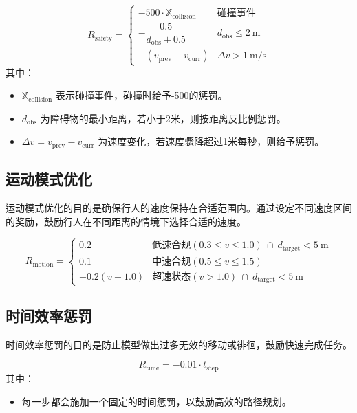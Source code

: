 	\begin{equation}
	R_{\text{safety}} =
	\begin{cases}
	-500 \cdot \mathbb{X}_{\text{collision}} & \text{碰撞事件} \\
	-\dfrac{0.5}{d_{\text{obs}} + 0.5} & d_{\text{obs}} \leq 2\ \text{m} \\
	-(v_{\text{prev}} - v_{\text{curr}}) & \Delta v > 1\ \text{m/s}
	\end{cases}
	\end{equation}
	其中：
	\begin{itemize}
	    \item \( \mathbb{X}_{\text{collision}} \) 表示碰撞事件，碰撞时给予-500的惩罚。
	    \item \( d_{\text{obs}} \) 为障碍物的最小距离，若小于2米，则按距离反比例惩罚。
	    \item \( \Delta v = v_{\text{prev}} - v_{\text{curr}} \) 为速度变化，若速度骤降超过1米每秒，则给予惩罚。
	\end{itemize}
	
	\subsection{运动模式优化}
	运动模式优化的目的是确保行人的速度保持在合适范围内。通过设定不同速度区间的奖励，鼓励行人在不同距离的情境下选择合适的速度。
	
	\begin{equation}
	R_{\text{motion}} =
	\begin{cases}
	0.2 & \text{低速合规}(0.3 \leq v \leq 1.0)\ \cap\ d_{\text{target}} < 5\ \text{m} \\
	0.1 & \text{中速合规}(0.5 \leq v \leq 1.5) \\
	-0.2(v-1.0) & \text{超速状态}(v > 1.0)\ \cap\ d_{\text{target}} < 5\ \text{m}
	\end{cases}
	\end{equation}
	
	\subsection{时间效率惩罚}
	时间效率惩罚的目的是防止模型做出过多无效的移动或徘徊，鼓励快速完成任务。
	
	\begin{equation}
	R_{\text{time}} = -0.01 \cdot t_{\text{step}}
	\end{equation}
	其中：
	\begin{itemize}
	    \item 每一步都会施加一个固定的时间惩罚，以鼓励高效的路径规划。
	\end{itemize}
	
